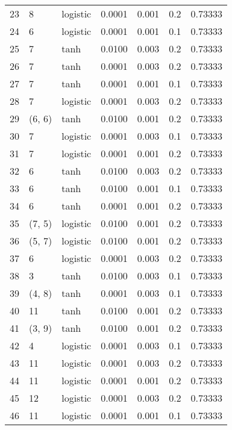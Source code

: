 \begin{tabular}{lllrrrr}
23  &           8 &  logistic &  0.0001 &  0.001 &  0.2 &   0.73333 \\
24  &           6 &  logistic &  0.0001 &  0.001 &  0.1 &   0.73333 \\
25  &           7 &      tanh &  0.0100 &  0.003 &  0.2 &   0.73333 \\
26  &           7 &      tanh &  0.0001 &  0.003 &  0.2 &   0.73333 \\
27  &           7 &      tanh &  0.0001 &  0.001 &  0.1 &   0.73333 \\
28  &           7 &  logistic &  0.0001 &  0.003 &  0.2 &   0.73333 \\
29  &      (6, 6) &      tanh &  0.0100 &  0.001 &  0.2 &   0.73333 \\
30  &           7 &  logistic &  0.0001 &  0.003 &  0.1 &   0.73333 \\
31  &           7 &  logistic &  0.0001 &  0.001 &  0.2 &   0.73333 \\
32  &           6 &      tanh &  0.0100 &  0.003 &  0.2 &   0.73333 \\
33  &           6 &      tanh &  0.0100 &  0.001 &  0.1 &   0.73333 \\
34  &           6 &      tanh &  0.0001 &  0.001 &  0.2 &   0.73333 \\
35  &      (7, 5) &  logistic &  0.0100 &  0.001 &  0.2 &   0.73333 \\
36  &      (5, 7) &  logistic &  0.0100 &  0.001 &  0.2 &   0.73333 \\
37  &           6 &  logistic &  0.0001 &  0.003 &  0.2 &   0.73333 \\
38  &           3 &      tanh &  0.0100 &  0.003 &  0.1 &   0.73333 \\
39  &      (4, 8) &      tanh &  0.0001 &  0.003 &  0.1 &   0.73333 \\
40  &          11 &      tanh &  0.0100 &  0.001 &  0.2 &   0.73333 \\
41  &      (3, 9) &      tanh &  0.0100 &  0.001 &  0.2 &   0.73333 \\
42  &           4 &  logistic &  0.0001 &  0.003 &  0.1 &   0.73333 \\
43  &          11 &  logistic &  0.0001 &  0.003 &  0.2 &   0.73333 \\
44  &          11 &  logistic &  0.0001 &  0.001 &  0.2 &   0.73333 \\
45  &          12 &  logistic &  0.0001 &  0.003 &  0.2 &   0.73333 \\
46  &          11 &  logistic &  0.0001 &  0.001 &  0.1 &   0.73333 \\

\end{tabular}
